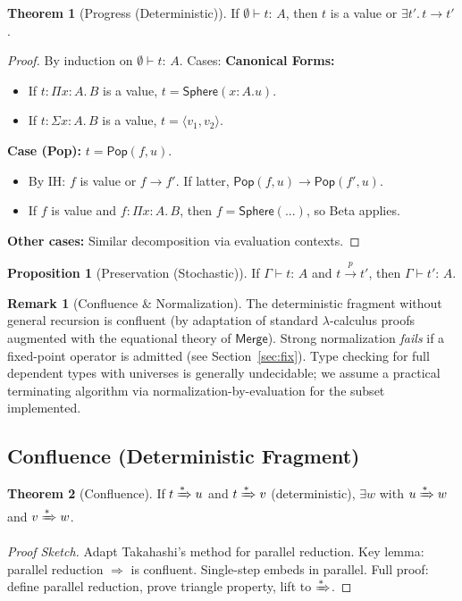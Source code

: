 \documentclass[12pt]{article}
\newcommand{\Entails}{\vdash}
\newcommand{\Types}{:\,}
\newcommand{\Sphere}{\mathsf{Sphere}}
\newcommand{\Pop}{\mathsf{Pop}}
\newcommand{\Merge}{\mathsf{Merge}}
\newcommand{\Pair}[2]{\langle #1, #2 \rangle}
\newcommand{\Ctx}{\Gamma}
\newcommand{\PiT}[3]{\Pi #1 : #2.\, #3}
\newcommand{\SigT}[3]{\Sigma #1 : #2.\, #3}
\newcommand{\step}{\rightarrow}
\newcommand{\pstep}[1]{\xrightarrow{#1}}
\newcommand{\steps}{\xRightarrow{*}}
\theoremstyle{definition}
\newtheorem{theorem}{Theorem}
\newtheorem{proposition}{Proposition}
\newtheorem{remark}{Remark}
\begin{document}
\begin{theorem}[Progress (Deterministic)]
If $\emptyset \Entails t \Types A$, then $t$ is a value or $\exists t'.\, t \step t'$.
\end{theorem}
\begin{proof}
By induction on $\emptyset \Entails t \Types A$. Cases:
\textbf{Canonical Forms:}
\begin{itemize}
\item If $t : \PiT{x}{A}{B}$ is a value, $t = \Sphere(x:A.u)$.
\item If $t : \SigT{x}{A}{B}$ is a value, $t = \Pair{v_1}{v_2}$.
\end{itemize}
\textbf{Case (Pop):} $t = \Pop(f,u)$.
\begin{itemize}
\item By IH: $f$ is value or $f \step f'$. If latter, $\Pop(f,u) \step \Pop(f',u)$.
\item If $f$ is value and $f : \PiT{x}{A}{B}$, then $f = \Sphere(...)$, so Beta applies.
\end{itemize}
\textbf{Other cases:} Similar decomposition via evaluation contexts.
\end{proof}

\begin{proposition}[Preservation (Stochastic)]
If $\Ctx \Entails t \Types A$ and $t \pstep{p} t'$, then $\Ctx \Entails t' \Types A$.
\end{proposition}

\begin{remark}[Confluence \& Normalization]
The deterministic fragment without general recursion is confluent (by adaptation of standard $\lambda$-calculus proofs augmented with the equational theory of $\Merge$). Strong normalization \emph{fails} if a fixed-point operator is admitted (see Section~\ref{sec:fix}). Type checking for full dependent types with universes is generally undecidable; we assume a practical terminating algorithm via normalization-by-evaluation for the subset implemented.
\end{remark}

\subsection{Confluence (Deterministic Fragment)}
\begin{theorem}[Confluence]
If $t \steps u$ and $t \steps v$ (deterministic), $\exists w$ with $u \steps w$ and $v \steps w$.
\end{theorem}
\begin{proof}[Proof Sketch]
Adapt Takahashi's method for parallel reduction. Key lemma:
parallel reduction $\Rightarrow$ is confluent. Single-step embeds in parallel.
Full proof: define parallel reduction, prove triangle property, lift to $\steps$.
\end{proof}
\end{document}
